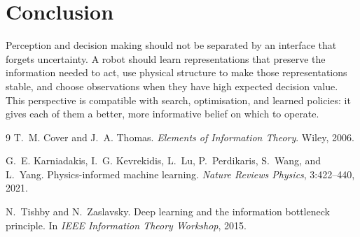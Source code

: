 \documentclass[11pt]{article}
\begin{document}
\section{Conclusion}
\label{sec:conclusion}

Perception and decision making should not be separated by an interface that
forgets uncertainty. A robot should learn representations that preserve the
information needed to act, use physical structure to make those representations
stable, and choose observations when they have high expected decision value.
This perspective is compatible with search, optimisation, and learned policies:
it gives each of them a better, more informative belief on which to operate.

\begin{thebibliography}{9}
T.~M. Cover and J.~A. Thomas.
\newblock \emph{Elements of Information Theory}.
\newblock Wiley, 2006.

G.~E. Karniadakis, I.~G. Kevrekidis, L.~Lu, P.~Perdikaris, S.~Wang, and
L.~Yang.
\newblock Physics-informed machine learning.
\newblock \emph{Nature Reviews Physics}, 3:422--440, 2021.

N.~Tishby and N.~Zaslavsky.
\newblock Deep learning and the information bottleneck principle.
\newblock In \emph{IEEE Information Theory Workshop}, 2015.
\end{thebibliography}
\end{document}
